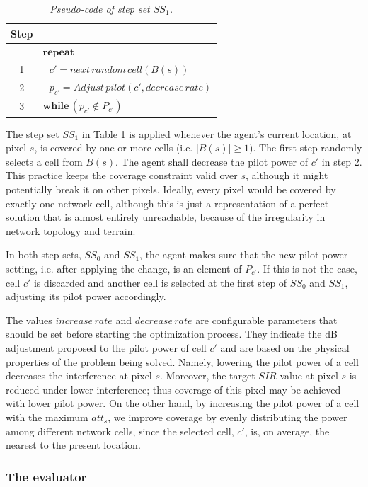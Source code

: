 \begin{table}
\caption{\textit{Pseudo-code of step set $SS_{1}$.\label{tab:Rule-set-1}}}


\centering

\begin{tabular}{c|l}
\hline 
Step & \tabularnewline[\doublerulesep]
\hline 
 & $\mathbf{repeat}$\tabularnewline
1 & $\,\,\,\, c'=next\, random\, cell(B(s))$\tabularnewline
2 & $\,\,\,\, p_{c'}=Adjust\, pilot(c',decrease\, rate)$\tabularnewline
3 & $\mathbf{while}\,(p_{c'}\notin P_{c'})$\tabularnewline
\end{tabular}
\end{table}


The step set $SS_{1}$ in Table \ref{tab:Rule-set-1} is applied whenever
the agent's current location, at pixel $s$, is covered by one or
more cells (i.e. $|B(s)|\ge1$). The first step randomly selects a
cell from $B(s)$. The agent shall decrease the pilot power of $c'$
in step 2. This practice keeps the coverage constraint valid over
$s$, although it might potentially break it on other pixels. Ideally,
every pixel would be covered by exactly one network cell, although
this is just a representation of a perfect solution that is almost
entirely unreachable, because of the irregularity in network topology
and terrain.

In both step sets, $SS_{0}$ and $SS_{1}$, the agent makes sure that
the new pilot power setting, i.e. after applying the change, is an
element of $P_{c'}$. If this is not the case, cell $c'$ is discarded
and another cell is selected at the first step of $SS_{0}$ and $SS_{1}$,
adjusting its pilot power accordingly. 

The values $increase\, rate$ and $decrease\, rate$ are configurable
parameters that should be set before starting the optimization process.
They indicate the dB adjustment proposed to the pilot power of cell
$c'$ and are based on the physical properties of the problem being
solved. Namely, lowering the pilot power of a cell decreases the interference
at pixel $s$. Moreover, the target $SIR$ value at pixel $s$ is
reduced under lower interference; thus coverage of this pixel may
be achieved with lower pilot power. On the other hand, by increasing
the pilot power of a cell with the maximum $att_{s}$, we improve
coverage by evenly distributing the power among different network
cells, since the selected cell, $c'$, is, on average, the nearest
to the present location.


\subsubsection{The evaluator}

